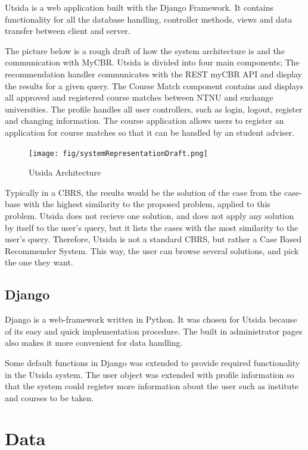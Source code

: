Utsida is a web application built with the Django Framework. It contains functionality for all the database handling, controller methods, views and data transfer between client and server. 

The picture below is a rough draft of how the system architecture is and the communication with MyCBR. Utsida is divided into four main components; The recommendation handler communicates with the REST myCBR API and display the results for a given query. The Course Match component contains and displays all approved and registered course matches between NTNU and exchange universities. The profile handles all user controllers, such as login, logout, register and changing information. The course application allows users to register an application for course matches so that it can be handled by an student adviser. 

\begin{figure}[H]
    \centering
    \texttt{[image: fig/systemRepresentationDraft.png]}
    \caption{Utsida Architecture}
    \label{fig:utsida}
\end{figure}

Typically in a CBRS, the results would be the solution of the case from the case-base with the highest similarity to the proposed problem, applied to this problem. Utsida does not recieve one solution, and does not apply any solution by itself to the user's query, but it lists the cases with the most similarity to the user's query. Therefore, Utsida is not a standard CBRS, but rather a Case Based Recommender System. This way, the user can browse several solutions, and pick the one they want.


\subsection{Django}
Django is a web-framework written in Python. It was chosen for Utsida because of its easy and quick implementation procedure. The built in administrator pages also makes it more convenient for data handling.

Some default functions in Django was extended to provide required functionality in the Utsida system. The user object was extended with profile information so that the system could register more information about the user such as institute and courses to be taken. 

\section{Data}

